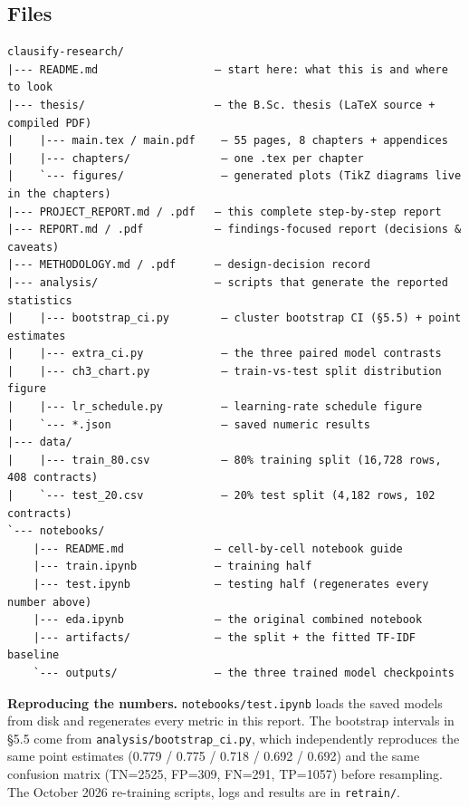 \documentclass[
  10pt,
]{article}
\begin{document}
\subsection{Files}

\begin{verbatim}
clausify-research/
|--- README.md                  — start here: what this is and where to look
|--- thesis/                    — the B.Sc. thesis (LaTeX source + compiled PDF)
|    |--- main.tex / main.pdf    — 55 pages, 8 chapters + appendices
|    |--- chapters/              — one .tex per chapter
|    `--- figures/               — generated plots (TikZ diagrams live in the chapters)
|--- PROJECT_REPORT.md / .pdf   — this complete step-by-step report
|--- REPORT.md / .pdf           — findings-focused report (decisions & caveats)
|--- METHODOLOGY.md / .pdf      — design-decision record
|--- analysis/                  — scripts that generate the reported statistics
|    |--- bootstrap_ci.py        — cluster bootstrap CI (§5.5) + point estimates
|    |--- extra_ci.py            — the three paired model contrasts
|    |--- ch3_chart.py           — train-vs-test split distribution figure
|    |--- lr_schedule.py         — learning-rate schedule figure
|    `--- *.json                 — saved numeric results
|--- data/
|    |--- train_80.csv           — 80% training split (16,728 rows, 408 contracts)
|    `--- test_20.csv            — 20% test split (4,182 rows, 102 contracts)
`--- notebooks/
    |--- README.md              — cell-by-cell notebook guide
    |--- train.ipynb            — training half
    |--- test.ipynb             — testing half (regenerates every number above)
    |--- eda.ipynb              — the original combined notebook
    |--- artifacts/             — the split + the fitted TF-IDF baseline
    `--- outputs/               — the three trained model checkpoints
\end{verbatim}

\textbf{Reproducing the numbers.} \texttt{notebooks/test.ipynb} loads the saved
models from disk and regenerates every metric in this report. The bootstrap
intervals in §5.5 come from \texttt{analysis/bootstrap\_ci.py}, which
independently reproduces the same point estimates (0.779 / 0.775 / 0.718 / 0.692
/ 0.692) and the same confusion matrix (TN=2525, FP=309, FN=291, TP=1057) before
resampling. The October 2026 re-training scripts, logs and results are in
\texttt{retrain/}.
\end{document}
